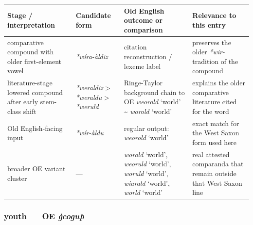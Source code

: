 \documentclass[
  british,
  a4paper,
]{article}
\newcounter{none} %
\providecommand{\Recon}[1]{\emph{*#1}}
\begin{document}
{\def\LTcaptype{none} %
\begin{longtable}[]{@{}
  >{\raggedright\arraybackslash}p{}
  >{\raggedright\arraybackslash}p{}
  >{\raggedright\arraybackslash}p{}
  >{\raggedright\arraybackslash}p{}@{}}
\toprule\noalign{}
\begin{minipage}[b]{\linewidth}\raggedright
Stage / interpretation
\end{minipage} & \begin{minipage}[b]{\linewidth}\raggedright
Candidate form
\end{minipage} & \begin{minipage}[b]{\linewidth}\raggedright
Old English outcome or comparison
\end{minipage} & \begin{minipage}[b]{\linewidth}\raggedright
Relevance to this entry
\end{minipage} \\
\midrule\noalign{}
\endhead
\bottomrule\noalign{}
\endlastfoot
comparative compound with older first-element vowel &
{\emph{*wíra-àldiz}} & citation reconstruction / lexeme label &
preserves the older \emph{*wir-} tradition of the compound \\
literature-stage lowered compound after early stem-class shift &
\Recon{weraldiz} \textgreater{} \Recon{weraldu} \textgreater{}
\Recon{weruld} & Ringe-Taylor background chain to OE {\emph{weorold}}
`world' \textasciitilde{} {\emph{worold}} `world' & explains the older
comparative literature cited for the word \\
Old English-facing input & {\emph{*wír-àldu}} & regular output:
{\emph{weorold}} `world' & exact match for the West Saxon form used
here \\
broader OE variant cluster & --- & {\emph{worold}} `world',
{\emph{weoruld}} `world', {\emph{woruld}} `world', {\emph{wiarald}}
`world', {\emph{world}} `world' & real attested comparanda that remain
outside that West Saxon line \\
\end{longtable}
}

\subsubsection{\texorpdfstring{youth --- OE
\emph{ġeoguþ}}{youth --- OE ġeoguþ}}\label{youth-oe-ux121eoguuxfe}
\end{document}
